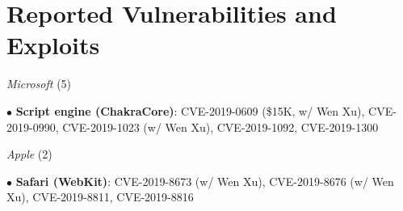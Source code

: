 \section*{Reported Vulnerabilities and Exploits}
\begin{description}

\item {\emph{Microsoft} (5)}
	\item $\bullet$ \textbf{Script engine (ChakraCore)}: CVE-2019-0609 (\$15K, w/ Wen Xu), CVE-2019-0990, CVE-2019-1023 (w/ Wen Xu), CVE-2019-1092, CVE-2019-1300

\item {\emph{Apple} (2)}
\item $\bullet$ \textbf{Safari (WebKit)}: CVE-2019-8673 (w/ Wen Xu), CVE-2019-8676 (w/ Wen Xu), CVE-2019-8811, CVE-2019-8816

\end{description}
